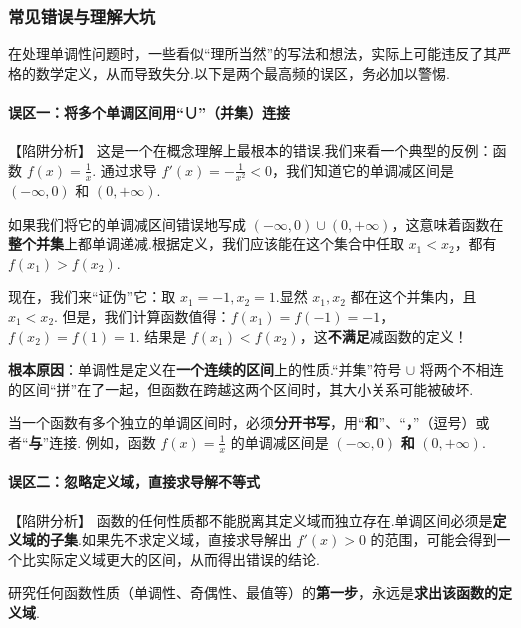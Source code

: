\subsubsection*{常见错误与理解大坑}

在处理单调性问题时，一些看似“理所当然”的写法和想法，实际上可能违反了其严格的数学定义，从而导致失分.以下是两个最高频的误区，务必加以警惕.

\paragraph{误区一：将多个单调区间用“∪”（并集）连接}
【陷阱分析】
这是一个在概念理解上最根本的错误.我们来看一个典型的反例：函数 $f(x) = \frac{1}{x}$.
通过求导 $f'(x)=-\frac{1}{x^2}<0$，我们知道它的单调减区间是 $(-\infty, 0)$ 和 $(0, +\infty)$.
	
如果我们将它的单调减区间错误地写成 $(-\infty, 0) \cup (0, +\infty)$，这意味着函数在\textbf{整个并集}上都单调递减.根据定义，我们应该能在这个集合中任取 $x_1 < x_2$，都有 $f(x_1) > f(x_2)$.
	
现在，我们来“证伪”它：取 $x_1 = -1, x_2 = 1$.显然 $x_1, x_2$ 都在这个并集内，且 $x_1 < x_2$.
但是，我们计算函数值得：$f(x_1) = f(-1) = -1$， $f(x_2) = f(1) = 1$.
结果是 $f(x_1) < f(x_2)$，这\textbf{不满足}减函数的定义！
	
\textbf{根本原因}：单调性是定义在\textbf{一个连续的区间}上的性质.“并集”符号 $\cup$ 将两个不相连的区间“拼”在了一起，但函数在跨越这两个区间时，其大小关系可能被破坏.

\begin{note}[正确书写方式]
	当一个函数有多个独立的单调区间时，必须\textbf{分开书写}，用“\textbf{和}”、“\textbf{，}”（逗号）或者“\textbf{与}”连接.
	例如，函数 $f(x)=\frac{1}{x}$ 的单调减区间是 $(-\infty, 0)$ \textbf{和} $(0, +\infty)$.
\end{note}

\paragraph{误区二：忽略定义域，直接求导解不等式}
【陷阱分析】
函数的任何性质都不能脱离其定义域而独立存在.单调区间必须是\textbf{定义域的子集}.如果先不求定义域，直接求导解出 $f'(x)>0$ 的范围，可能会得到一个比实际定义域更大的区间，从而得出错误的结论.

\begin{note}[解题铁律]
	研究任何函数性质（单调性、奇偶性、最值等）的\textbf{第一步}，永远是\textbf{求出该函数的定义域}.
\end{note}

